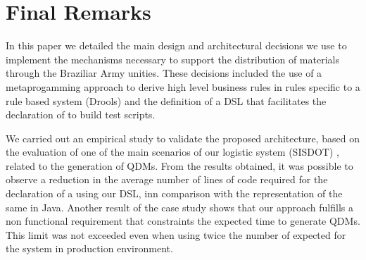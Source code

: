 \section{Final Remarks}
\label{sec:conclusao}


In this paper we detailed the main design and architectural decisions we use to 
implement the mechanisms necessary to support the distribution of materials 
through the Braziliar Army unities. These decisions included the use of 
a metaprogamming approach to derive high level business rules in rules specific to a rule 
based system (Drools) and the definition of a DSL that facilitates the declaration of \callers 
to build test scripts. 


We carried out an empirical study to validate the proposed architecture, based on the evaluation of one of the 
main scenarios of our logistic system (SISDOT) , related to the generation of QDMs. From the results obtained, 
it was possible to observe a reduction in the average number of lines of code required for the declaration 
of a \callers using our DSL, inn comparison with the representation of the same \shc in Java. 
Another result of the case study shows that our approach fulfills a non functional requirement that constraints 
the expected time to generate QDMs. This limit was not exceeded even when using twice the number of \callers 
expected for the system in production environment.

